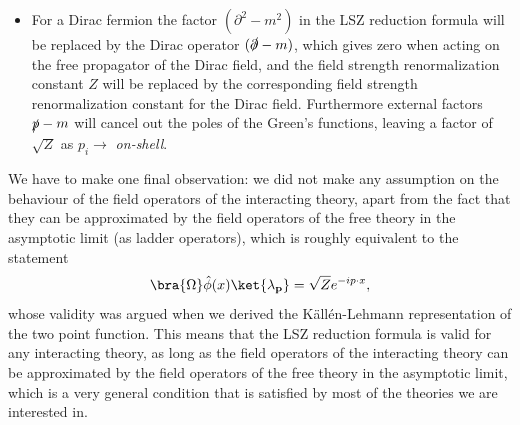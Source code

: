 \begin{itemize}
\begin{itemize}
              \item \(u_{s,\alpha}\) for \textit{incoming particles};
              \item \(v_{s,\alpha} \) for \textit{outgoing antiparticles};
              \item \(\overline{v}_{s,\alpha} \) for \textit{incoming antiparticles}.
          \end{itemize}
          If we instead consider a spin-1 gauge field, we would have the following field operators for the in and out states:
          \begin{itemize}
              \item \(\epsilon_{\mu}(p,\,\lambda)\) for \textit{outgoing particles};
              \item \(\epsilon_{\mu}^*(p,\,\lambda)\) for \textit{incoming particles}.
          \end{itemize}
          The spinorial/vectorial indices (\(\alpha\), \(\mu\) etc.) of the field operators will be contracted with the corresponding indices of the Green's functions in the LSZ reduction formula, and the final expression for the S-matrix elements will involve the appropriate spinor/vector structures for each type of particle in the in and out states:
          \[
              \bra{\Omega} T\{ \dots A^{\mu}(x) \dots \psi_{\alpha}(y) \dots \} \ket{\Omega}.
          \]
    \item For a Dirac fermion the factor \((\partial^2 - m^2)\) in the LSZ reduction formula will be replaced by the Dirac operator \((\slashed{\partial} - m)\), which gives zero when acting on the free propagator of the Dirac field, and the field strength renormalization constant \(Z\) will be replaced by the corresponding field strength renormalization constant for the Dirac field. Furthermore external factors \(\slashed{p}-m\) will cancel out the poles of the Green's functions, leaving a factor of \(\sqrt{Z}\) as \(p_i \to\) \textit{on-shell}.
\end{itemize}

We have to make one final observation: we did not make any assumption on the behaviour of the field operators of the interacting theory, apart from the fact that they can be approximated by the field operators of the free theory in the asymptotic limit (as ladder operators), which is roughly equivalent to the statement
\[
    \bra{\Omega} \hat{\phi}(x) \ket{\lambda_{\mathbf{p}}} = \sqrt{Z} e^{-i p \cdot x},
\]
whose validity was argued when we derived the Källén-Lehmann representation of the two point function. This means that the LSZ reduction formula is valid for any interacting theory, as long as the field operators of the interacting theory can be approximated by the field operators of the free theory in the asymptotic limit, which is a very general condition that is satisfied by most of the theories we are interested in.

